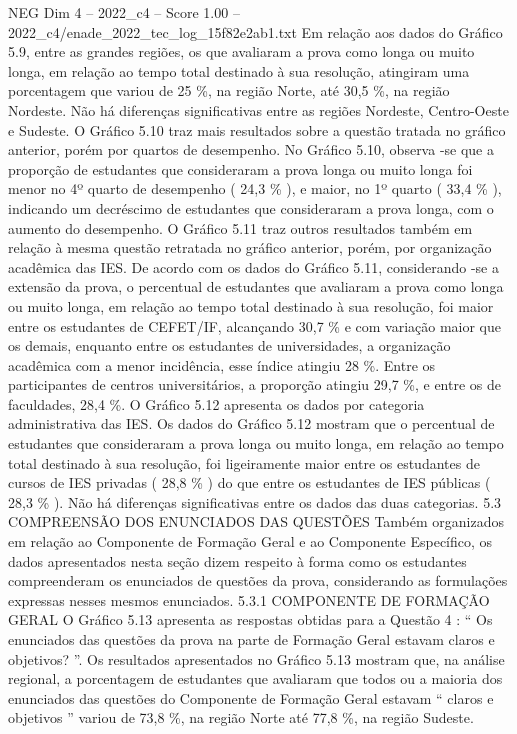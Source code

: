\begin{textsample}{NEG Dim 4 – 2022\_c4 – Score 1.00 – 2022\_c4/enade\_2022\_tec\_log\_15f82e2ab1.txt}
Em relação aos dados do Gráfico 5.9, entre as grandes regiões, os que avaliaram a prova como longa ou muito longa, em relação ao tempo total destinado à sua resolução, atingiram uma porcentagem que variou de 25 \%, na região Norte, até 30,5 \%, na região Nordeste.
Não há diferenças significativas entre as regiões Nordeste, Centro-Oeste e Sudeste.
O Gráfico 5.10 traz mais resultados sobre a questão tratada no gráfico anterior, porém por quartos de desempenho.
No Gráfico 5.10, observa -se que a proporção de estudantes que consideraram a prova longa ou muito longa foi menor no 4º quarto de desempenho ( 24,3 \% ), e maior, no 1º quarto ( 33,4 \% ), indicando um decréscimo de estudantes que consideraram a prova longa, com o aumento do desempenho.
O Gráfico 5.11 traz outros resultados também em relação à mesma questão retratada no gráfico anterior, porém, por organização acadêmica das IES.
De acordo com os dados do Gráfico 5.11, considerando -se a extensão da prova, o percentual de estudantes que avaliaram a prova como longa ou muito longa, em relação ao tempo total destinado à sua resolução, foi maior entre os estudantes de CEFET/IF, alcançando 30,7 \% e com variação maior que os demais, enquanto entre os estudantes de universidades, a organização acadêmica com a menor incidência, esse índice atingiu 28 \%.
Entre os participantes de centros universitários, a proporção atingiu 29,7 \%, e entre os de faculdades, 28,4 \%.
O Gráfico 5.12 apresenta os dados por categoria administrativa das IES.
Os dados do Gráfico 5.12 mostram que o percentual de estudantes que consideraram a prova longa ou muito longa, em relação ao tempo total destinado à sua resolução, foi ligeiramente maior entre os estudantes de cursos de IES privadas ( 28,8 \% ) do que entre os estudantes de IES públicas ( 28,3 \% ).
Não há diferenças significativas entre os dados das duas categorias. 5.3 COMPREENSÃO DOS ENUNCIADOS DAS QUESTÕES Também organizados em relação ao Componente de Formação Geral e ao Componente Específico, os dados apresentados nesta seção dizem respeito à forma como os estudantes compreenderam os enunciados de questões da prova, considerando as formulações expressas nesses mesmos enunciados. 5.3.1 COMPONENTE DE FORMAÇÃO GERAL O Gráfico 5.13 apresenta as respostas obtidas para a Questão 4 : “ Os enunciados das questões da prova na parte de Formação Geral estavam claros e objetivos? ”.
Os resultados apresentados no Gráfico 5.13 mostram que, na análise regional, a porcentagem de estudantes que avaliaram que todos ou a maioria dos enunciados das questões do Componente de Formação Geral estavam “ claros e objetivos ” variou de 73,8 \%, na região Norte até 77,8 \%, na região Sudeste.

\end{textsample}
